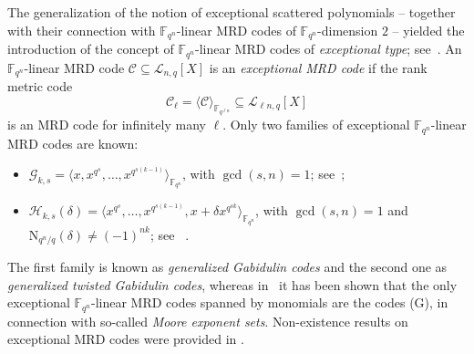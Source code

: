 The generalization of the notion of exceptional scattered polynomials -- together with  their connection with $\mathbb{F}_{q^n}$-linear MRD codes of ${\mathbb F}_{q^n}$-dimension $2$ -- yielded the introduction of the concept of 
 $\mathbb{F}_{q^n}$-linear MRD codes of \emph{exceptional type}; see~\cite{bartoli2021linear}.
An $\mathbb{F}_{q^n}$-linear MRD code $\mathcal{C}\subseteq\mathcal{L}_{n,q}[X]$ is an \emph{exceptional MRD code} if the rank metric code
\[ \mathcal{C}_\ell=\langle\mathcal{C}\rangle_{\mathbb{F}_{q^{\ell n}}}\subseteq \mathcal{L}_{\ell n,q}[X] \]
is an MRD code for infinitely many $\ell$.
Only two families of exceptional $\mathbb{F}_{q^n}$-linear MRD codes are known:
\begin{itemize}
    \item[(G)] $\mathcal{G}_{k,s}=\langle x,x^{q^s},\ldots,x^{q^{s(k-1)}}\rangle_{\mathbb{F}_{q^n}}$, with $\gcd(s,n)=1$; see~\cite{delsarte1978bilinear,gabidulin1985theory,kshevetskiy2005new};
    \item[(T)] $\mathcal{H}_{k,s}(\delta)=\langle x^{q^s},\ldots,x^{q^{s(k-1)}},x+\delta x^{q^{sk}}\rangle_{\mathbb{F}_{q^n}}$, with $\gcd(s,n)=1$ and $\mathrm{N}_{q^n/q}(\delta)\neq (-1)^{nk}$; see ~\cite{sheekey2016new,lunardon2018generalized}. 
\end{itemize}
The first family is known as \emph{generalized Gabidulin codes} and the second one as \emph{generalized twisted Gabidulin codes}, whereas in~\cite{bartoli2018exceptional} it has been shown that the only exceptional $\mathbb{F}_{q^n}$-linear MRD codes spanned by monomials are the codes (G), in connection with so-called \emph{Moore exponent sets}. Non-existence results on exceptional MRD codes were provided in \cite[Main Theorem]{bartoli2021linear}.

